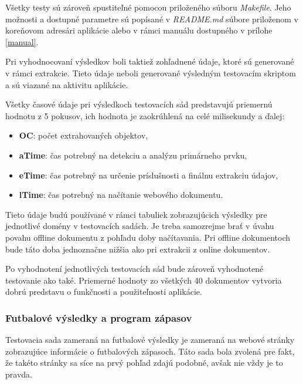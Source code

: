 Všetky testy sú zároveň spustiteľné pomocou priloženého súboru \textit{Makefile}. Jeho možnosti a dostupné parametre sú popísané v \textit{README.md} súbore priloženom v koreňovom adresári aplikácie alebo v rámci manuálu dostupného v prílohe \ref{manual}.

\bigskip

Pri vyhodnocovaní výsledkov boli taktiež zohľadnené údaje, ktoré sú generované v rámci extrakcie. Tieto údaje neboli generované výsledným testovacím skriptom a sú viazané na aktivitu aplikácie.

Všetky časové údaje pri výsledkoch testovacích sád predstavujú priemernú hodnotu z 5 pokusov, ich hodnota je zaokrúhlená na celé milisekundy a ďalej:

\begin{itemize}
    \item \textbf{OC}: počet extrahovaných objektov,
    \item \textbf{aTime}: čas potrebný na detekciu a analýzu primárneho prvku,
    \item \textbf{eTime}: čas potrebný na určenie príslušnosti a finálnu extrakciu údajov,
    \item \textbf{lTime}: čas potrebný na načítanie webového dokumentu.
\end{itemize}

\bigskip

Tieto údaje budú používané v rámci tabuliek zobrazujúcich výsledky pre jednotlivé domény v testovacích sadách. Je treba samozrejme brať v úvahu povahu offline dokumentu z pohľadu doby načítavania. Pri offline dokumentoch bude táto doba jednoznačne nižšia ako pri extrakcii z online dokumentov. 

Po vyhodnotení jednotlivých testovacích sád bude zároveň vyhodnotené testovanie ako také. Priemerné hodnoty zo všetkých 40 dokumentov vytvoria dobrú predstavu o funkčnosti a použiteľnosti aplikácie.

\newpage

\subsubsection{Futbalové výsledky a program zápasov}
\label{football}

Testovacia sada zameraná na futbalové výsledky je zameraná na webové stránky zobrazujúce informácie o futbalových zápasoch. Táto sada bola zvolená pre fakt, že takéto stránky sa síce na prvý pohľad zdajú podobné, avšak nie vždy je to pravda. 

